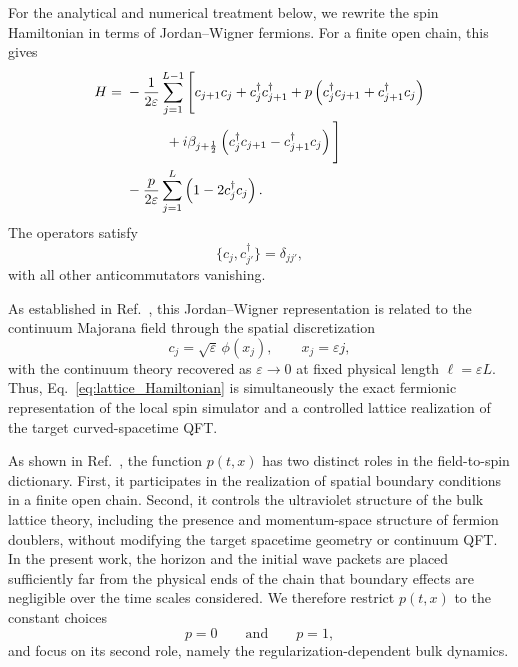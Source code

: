\documentclass[reprint,amsmath,amssymb,aps,prb,showkeys,superscriptaddress]{revtex4-2}
\begin{document}
For the analytical and numerical treatment below, we rewrite the
spin Hamiltonian in terms of Jordan--Wigner fermions. For a finite
open chain, this gives
\begin{align}
  H
  ={}&
  -\frac{1}{2\varepsilon}
  \sum_{j=1}^{L-1}
  \Bigg[
    c_{j+1}c_j
    +
    c_j^\dagger c_{j+1}^\dagger
    +
    p\left(
      c_j^\dagger c_{j+1}
      +
      c_{j+1}^\dagger c_j
    \right)
  \nonumber\\
  &\hspace{10mm}
    +
    i\beta_{j+\frac12}
    \left(
      c_j^\dagger c_{j+1}
      -
      c_{j+1}^\dagger c_j
    \right)
  \Bigg]
  \nonumber\\
  &-
  \frac{p}{2\varepsilon}
  \sum_{j=1}^{L}
  \left(
    1-2c_j^\dagger c_j
  \right).
  \label{eq:lattice_Hamiltonian}
\end{align}
The operators satisfy
\begin{equation}
  \{c_j,c_{j'}^\dagger\}
  =
  \delta_{jj'},
  \label{eq:lattice_anticommutation}
\end{equation}
with all other anticommutators vanishing.

As established in Ref.~\cite{Kinoshita2025}, this Jordan--Wigner
representation is related to the continuum Majorana field through
the spatial discretization
\begin{equation}
  c_j
  =
  \sqrt{\varepsilon}\,
  \phi(x_j),
  \qquad
  x_j=\varepsilon j,
  \label{eq:continuum_identification}
\end{equation}
with the continuum theory recovered as
$\varepsilon\to0$ at fixed physical length
$\ell=\varepsilon L$. Thus,
Eq.~\eqref{eq:lattice_Hamiltonian} is simultaneously the exact
fermionic representation of the local spin simulator and a
controlled lattice realization of the target curved-spacetime QFT.

As shown in Ref.~\cite{KinoshitaBoundary2026}, the function
$p(t,x)$ has two distinct roles in the field-to-spin dictionary.
First, it participates in the realization of spatial boundary
conditions in a finite open chain. Second, it controls the
ultraviolet structure of the bulk lattice theory, including the
presence and momentum-space structure of fermion doublers, without
modifying the target spacetime geometry or continuum QFT. In the
present work, the horizon and the initial wave packets are placed
sufficiently far from the physical ends of the chain that boundary
effects are negligible over the time scales considered. We therefore
restrict $p(t,x)$ to the constant choices
\begin{equation}
  p=0
  \qquad\text{and}\qquad
  p=1,
  \label{eq:p_choices}
\end{equation}
and focus on its second role, namely the regularization-dependent
bulk dynamics.
\end{document}
